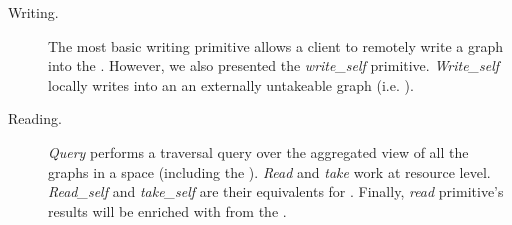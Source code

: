 \begin{description}
 \item[Writing.]
      The most basic writing primitive allows a client to remotely write a graph into the \coordspace{}.
      However, we also presented the \emph{write\_self} primitive.
      \emph{Write\_self} locally writes into an \asteroid{} an externally untakeable graph (i.e. \selfgraphs{}).
 \item[Reading.]
      \emph{Query} performs a traversal query over the aggregated view of all the graphs in a space (including the \selfgraphs{}).
      \emph{Read} and \emph{take} work at resource level.
      \emph{Read\_self} and \emph{take\_self} are their equivalents for \selfgraphs{}.
      Finally, \emph{read} primitive's results will be enriched with \selfgraphs{} from the \outerspace{}. %
\end{description}